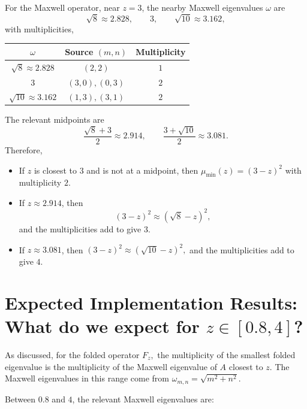 \documentclass[12pt,a4paper]{article}
\begin{document}
For the Maxwell operator, near $z=3$, the nearby Maxwell eigenvalues $\omega$
are
\begin{equation}
    \sqrt{8} \approx 2.828,
    \qquad
    3,
    \qquad
    \sqrt{10} \approx 3.162,
\end{equation}
with multiplicities,
\begin{center}
\begin{tabular}{|c| c |c|}
\toprule
$\omega$ & Source $(m,n)$ & Multiplicity \\
\midrule
$\sqrt{8}\approx 2.828$ & $(2,2)$ & $1$ \\
$3$ & $(3,0),(0,3)$ & $2$ \\
$\sqrt{10}\approx 3.162$ & $(1,3),(3,1)$ & $2$ \\
\bottomrule
\end{tabular}
\end{center}
The relevant midpoints are
\begin{equation}
    \frac{\sqrt{8}+3}{2} \approx 2.914,
    \qquad
    \frac{3+\sqrt{10}}{2} \approx 3.081 .
\end{equation}
Therefore,
\begin{itemize}
    \item If $z$ is closest to $3$ and is not at a midpoint, then
    $\mu_{\min}(z)=(3-z)^2$
    with multiplicity $2$.

    \item If $z\approx 2.914$, then
    $$(3-z)^2 \approx (\sqrt{8}-z)^2,$$
    and the multiplicities add to give $3.$

    \item If $z\approx 3.081$, then $(3-z)^2 \approx (\sqrt{10}-z)^2,$ and the multiplicities add to give $4.$
\end{itemize}

\section{Expected Implementation Results: What do we expect for $z\in[0.8,4]$?}

As discussed, for the folded operator $F_z,$
the multiplicity of the smallest folded eigenvalue is the multiplicity of the
Maxwell eigenvalue of $A$ closest to $z$. The Maxwell eigenvalues in this range
come from $\omega_{m,n}=\sqrt{m^2+n^2}.$


Between $0.8$ and $4$, the relevant Maxwell eigenvalues are:
\end{document}
